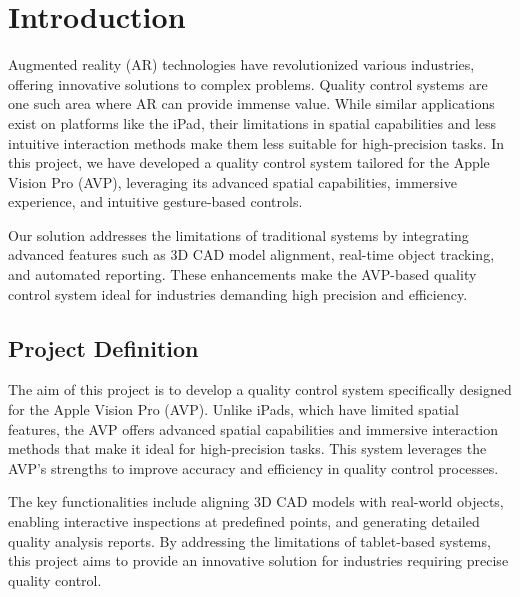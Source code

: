 \chapter{Introduction}

Augmented reality (AR) technologies have revolutionized various industries, offering innovative solutions to complex problems. Quality control systems are one such area where AR can provide immense value. While similar applications exist on platforms like the iPad, their limitations in spatial capabilities and less intuitive interaction methods make them less suitable for high-precision tasks. In this project, we have developed a quality control system tailored for the Apple Vision Pro (AVP), leveraging its advanced spatial capabilities, immersive experience, and intuitive gesture-based controls.

Our solution addresses the limitations of traditional systems by integrating advanced features such as 3D CAD model alignment, real-time object tracking, and automated reporting. These enhancements make the AVP-based quality control system ideal for industries demanding high precision and efficiency.

\section{Project Definition}

The aim of this project is to develop a quality control system specifically designed for the Apple Vision Pro (AVP). Unlike iPads, which have limited spatial features, the AVP offers advanced spatial capabilities and immersive interaction methods that make it ideal for high-precision tasks. This system leverages the AVP’s strengths to improve accuracy and efficiency in quality control processes.

The key functionalities include aligning 3D CAD models with real-world objects, enabling interactive inspections at predefined points, and generating detailed quality analysis reports. By addressing the limitations of tablet-based systems, this project aims to provide an innovative solution for industries requiring precise quality control.



